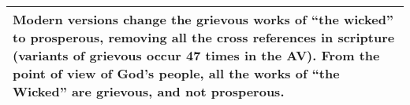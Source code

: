 \begin{mdframed}[style=MyFrame]
\begin{center}
\begin{longtable}{|p{.5in}|p{3.5in}|}
\multicolumn{2}{p{4.3in}}{{Modern versions change the grievous works of ``the wicked'' to prosperous, removing all the cross references in scripture (variants of grievous occur 47 times in the AV).  From the point of view of God's people, all the works of ``the Wicked'' are grievous, and not prosperous.}} \\ %

\hline

\end{longtable}
\end{center}

\normalsize 
\end{mdframed}